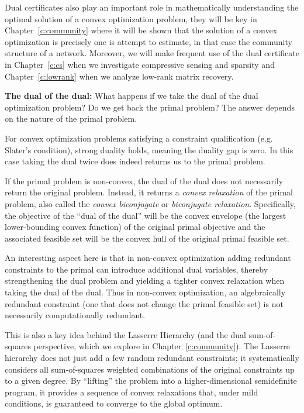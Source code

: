 \medskip

Dual certificates also play an important role in mathematically understanding the optimal solution of a convex optimization problem, they will be key in Chapter~\ref{c:community} where it will be shown that the solution of a convex optimization is precisely one is attempt to estimate, in that case the community structure of a network. Moreover, we will make frequent use of the dual certificate in Chapter~\ref{c:cs} when we investigate compressive sensing and sparsity and Chapter~\ref{c:lowrank} when we analyze low-rank matrix recovery.




\medskip
\noindent
\textbf{The dual of the dual:}
What happens if we take the dual of the dual optimization problem? Do we get back the primal problem? The answer depends on the nature of the primal problem.

For convex optimization problems satisfying a constraint qualification (e.g. Slater's condition), strong duality holds, meaning the duality gap is zero. In this case taking the dual twice does indeed returns us to the primal problem.

If the primal problem is non-convex, the dual of the dual does not necessarily return the original problem. Instead, it returns a {\em convex relaxation} of the primal problem, also called the {\em convex biconjugate} or {\em biconjugate relaxation}. Specifically, the objective of the ``dual of the dual'' will be the convex envelope (the largest lower-bounding convex function) of the original primal objective and the associated feasible set  will be the convex hull of the original primal feasible set. 

An interesting aspect here is that in non-convex optimization adding redundant constraints to the primal can introduce additional dual variables, thereby strengthening the dual problem and yielding a tighter convex relaxation when taking the dual of the dual. Thus in non-convex optimization, 
an algebraically redundant constraint (one that does not change the primal feasible set) is not necessarily computationally redundant. 

This is also a key idea behind the Lasserre Hierarchy (and the dual sum-of-squares perspective, which we explore in Chapter~\ref{c:community}). 
The Lasserre hierarchy does not just add a few random redundant constraints; it systematically 
considers all sum-of-squares weighted combinations of the original constraints up to a given degree. By ``lifting'' the problem into a higher-dimensional semidefinite program, it provides a sequence of convex relaxations that, under mild conditions, is guaranteed to converge to the global optimum.



